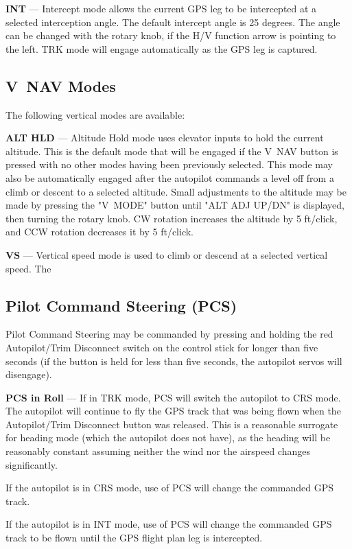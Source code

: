 \textbf{INT} --- Intercept mode allows the current GPS leg to be intercepted at a selected interception angle.  The default intercept angle is 25 degrees.  The angle can be changed with the rotary knob, if the H/V function arrow is pointing to the left.  TRK mode will engage automatically as the GPS leg is captured.

\subsection*{V~NAV Modes}
The following vertical modes are available:

\textbf{ALT HLD} --- Altitude Hold mode uses elevator inputs to hold the current altitude.  This is the default mode that will be engaged if the V~NAV button is pressed with no other modes having been previously selected.  This mode may also be automatically engaged after the autopilot commands a level off from a climb or descent to a selected altitude.  Small adjustments to the altitude may be made by pressing the "V~MODE" button until "ALT ADJ UP/DN" is displayed, then turning the rotary knob.  CW rotation increases the altitude by 5 ft/click, and CCW rotation decreases it by 5 ft/click.

\textbf{VS} --- Vertical speed mode is used to climb or descend at a selected vertical speed.  The 

\subsection*{Pilot Command Steering (PCS)}

Pilot Command Steering may be commanded by pressing and holding the red Autopilot/Trim Disconnect switch on the control stick for longer than five seconds (if the button is held for less than five seconds, the autopilot servos will disengage).

\textbf{PCS in Roll} --- If in TRK mode, PCS will switch the autopilot to CRS mode. The autopilot will continue to fly the GPS track that was being flown when the Autopilot/Trim Disconnect button was released. This is a reasonable surrogate for heading mode (which the autopilot does not have), as the heading will be reasonably constant assuming neither the wind nor the airspeed changes significantly. 

If the autopilot is in CRS mode, use of PCS will change the commanded GPS track.

If the autopilot is in INT mode, use of PCS will change the commanded GPS track to be flown until the GPS flight plan leg is intercepted.

